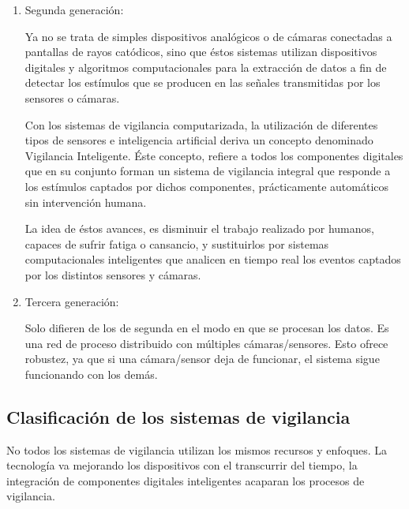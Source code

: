 \documentclass[a4paper,12pt,oneside,spanish]{book}
\begin{document}
\begin{enumerate}
	\item Segunda generación: \par
	Ya no se trata de simples dispositivos analógicos o de cámaras conectadas a pantallas de rayos catódicos, sino que éstos sistemas utilizan dispositivos digitales y algoritmos computacionales para la extracción de datos a fin de detectar los estímulos que se producen en las señales transmitidas por los sensores o cámaras. \par
	Con los sistemas de vigilancia computarizada, la utilización de diferentes tipos de sensores e inteligencia artificial deriva un concepto denominado Vigilancia Inteligente. Éste concepto, refiere a todos los componentes digitales que en su conjunto forman un sistema de vigilancia integral que responde a los estímulos captados por dichos componentes, prácticamente automáticos sin intervención humana. \par
	\par
	La idea de éstos avances, es disminuir el trabajo realizado por  humanos, capaces de sufrir fatiga o cansancio, y sustituirlos por sistemas computacionales inteligentes que analicen en tiempo real los eventos captados por los distintos sensores y cámaras.\\
	
	\item Tercera generación: \par
	Solo difieren de los de segunda en el modo en que se procesan los datos. Es una red de proceso distribuido con múltiples cámaras/sensores. Esto ofrece robustez, ya que si una cámara/sensor deja de funcionar, el sistema sigue funcionando con los demás.
\end{enumerate}



\subsection{Clasificación de los sistemas de vigilancia}

No todos los sistemas de vigilancia utilizan los mismos recursos y enfoques. La tecnología va mejorando los dispositivos con el transcurrir del tiempo, la integración de componentes digitales inteligentes acaparan los procesos de vigilancia. \par
\end{document}

